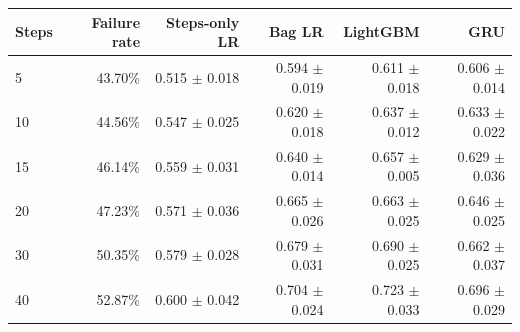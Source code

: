 \begin{tabular}{lrrrrr}
\toprule
Steps & Failure rate & Steps-only LR & Bag LR & LightGBM & GRU \\
\midrule
5 & 43.70\% & 0.515 $\pm$ 0.018 & 0.594 $\pm$ 0.019 & 0.611 $\pm$ 0.018 & 0.606 $\pm$ 0.014 \\
10 & 44.56\% & 0.547 $\pm$ 0.025 & 0.620 $\pm$ 0.018 & 0.637 $\pm$ 0.012 & 0.633 $\pm$ 0.022 \\
15 & 46.14\% & 0.559 $\pm$ 0.031 & 0.640 $\pm$ 0.014 & 0.657 $\pm$ 0.005 & 0.629 $\pm$ 0.036 \\
20 & 47.23\% & 0.571 $\pm$ 0.036 & 0.665 $\pm$ 0.026 & 0.663 $\pm$ 0.025 & 0.646 $\pm$ 0.025 \\
30 & 50.35\% & 0.579 $\pm$ 0.028 & 0.679 $\pm$ 0.031 & 0.690 $\pm$ 0.025 & 0.662 $\pm$ 0.037 \\
40 & 52.87\% & 0.600 $\pm$ 0.042 & 0.704 $\pm$ 0.024 & 0.723 $\pm$ 0.033 & 0.696 $\pm$ 0.029 \\
\bottomrule
\end{tabular}
